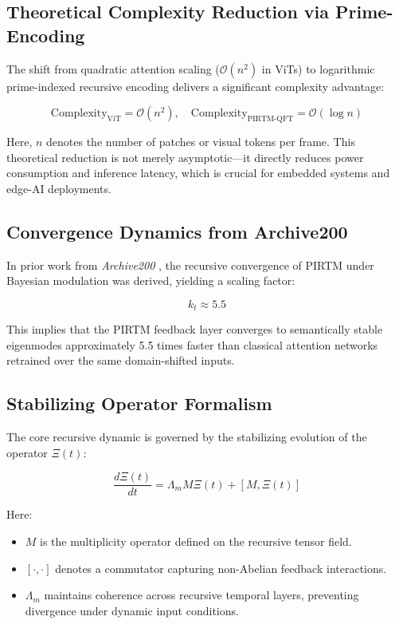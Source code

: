 \documentclass[12pt]{article}
\theoremstyle{plain}
\begin{document}
\subsection*{Theoretical Complexity Reduction via Prime-Encoding}

The shift from quadratic attention scaling ($\mathcal{O}(n^2)$ in ViTs) to logarithmic prime-indexed recursive encoding delivers a significant complexity advantage:

\[
\text{Complexity}_{\text{ViT}} = \mathcal{O}(n^2), \quad \text{Complexity}_{\text{PIRTM-QFT}} = \mathcal{O}(\log n)
\]

Here, $n$ denotes the number of patches or visual tokens per frame. This theoretical reduction is not merely asymptotic—it directly reduces power consumption and inference latency, which is crucial for embedded systems and edge-AI deployments.

\subsection*{Convergence Dynamics from Archive200}

In prior work from \textit{Archive200} \cite{vangelder2025}, the recursive convergence of PIRTM under Bayesian modulation was derived, yielding a scaling factor:

\[
k_t \approx 5.5
\]

This implies that the PIRTM feedback layer converges to semantically stable eigenmodes approximately 5.5 times faster than classical attention networks retrained over the same domain-shifted inputs.

\subsection*{Stabilizing Operator Formalism}

The core recursive dynamic is governed by the stabilizing evolution of the operator $\Xi(t)$:

\[
\frac{d\Xi(t)}{dt} = \Lambda_m M \Xi(t) + [M, \Xi(t)]
\]

Here:
\begin{itemize}
    \item $M$ is the multiplicity operator defined on the recursive tensor field.
    \item $[\cdot, \cdot]$ denotes a commutator capturing non-Abelian feedback interactions.
    \item $\Lambda_m$ maintains coherence across recursive temporal layers, preventing divergence under dynamic input conditions.
\end{itemize}
\end{document}
